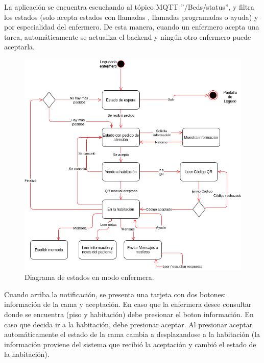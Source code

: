  

La aplicación se encuentra escuchando al tópico MQTT ''/Beds/status'', y filtra los estados (solo acepta estados con llamadas , llamadas programadas o ayuda) y por especialidad del enfermero. De esta manera, cuando un enfermero acepta una tarea, automáticamente se actualiza el backend y ningún otro enfermero puede aceptarla.



\begin{figure}[ht]
	\centering
	\includegraphics[scale=.60]{./Figures/app/estados-enf.png}
	\caption{ Diagrama de estados en modo enfermera.}
	\label{fig: Diagrama de estados en modo enfermera.}
\end{figure} 


Cuando arriba la notificación, se presenta una tarjeta con dos botones: información de la cama y aceptación. En caso que la enfermera desee consultar donde se encuentra (piso y habitación) debe presionar el boton información. En caso que decida ir a la habitación, debe presionar aceptar.
Al presionar aceptar automáticamente el estado de la cama cambia a desplazandose a la habitación (la información proviene del sistema que recibió la aceptación y cambió el estado de la habitación).


